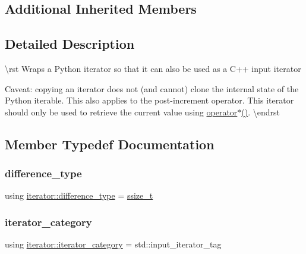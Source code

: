 \subsection*{Additional Inherited Members}


\subsection{Detailed Description}
\textbackslash{}rst Wraps a Python iterator so that it can also be used as a C++ input iterator

Caveat\+: copying an iterator does not (and cannot) clone the internal state of the Python iterable. This also applies to the post-\/increment operator. This iterator should only be used to retrieve the current value using {\ttfamily \mbox{\hyperlink{classiterator_a1a895cbe29c76f26c410dbbfe3565425}{operator$\ast$()}}}. \textbackslash{}endrst 

\subsection{Member Typedef Documentation}
\mbox{\label{classiterator_a573d7d10c131e60e9dbc7f691a3c03b1}} 
\subsubsection{\texorpdfstring{difference\_type}{difference\_type}}
{\footnotesize\ttfamily using \mbox{\hyperlink{classiterator_a573d7d10c131e60e9dbc7f691a3c03b1}{iterator\+::difference\+\_\+type}} =  \mbox{\hyperlink{detail_2common_8h_ac430d16fc097b3bf0a7469cfd09decda}{ssize\+\_\+t}}}

\mbox{\label{classiterator_ab77598aff5149ea763f55e0a375c58bd}} 
\subsubsection{\texorpdfstring{iterator\_category}{iterator\_category}}
{\footnotesize\ttfamily using \mbox{\hyperlink{classiterator_ab77598aff5149ea763f55e0a375c58bd}{iterator\+::iterator\+\_\+category}} =  std\+::input\+\_\+iterator\+\_\+tag}

